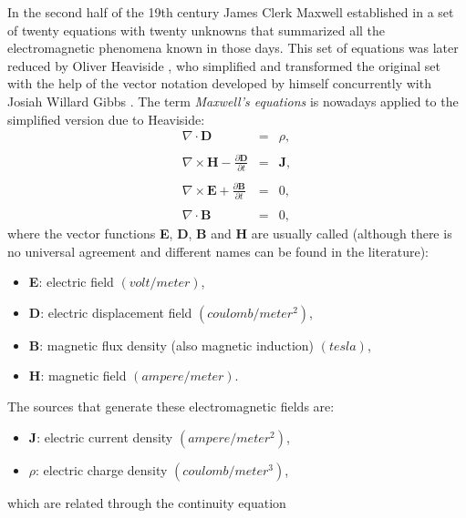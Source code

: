 In the second half of the 19th century James Clerk Maxwell established in \cite{OriginalMaxwell, TreatiseMaxwell} a set of twenty equations with twenty unknowns that summarized all the electromagnetic phenomena known in those days. This set of equations was later reduced by Oliver Heaviside \cite{HeavisideMaxwell, HeavisideBio}, who simplified and transformed the original set with the help of the vector notation developed by himself concurrently with Josiah Willard Gibbs \cite{GibbsVectors, GibbsBio}. The term \emph{Maxwell's equations} is nowadays applied to the simplified version due to Heaviside:
\\[-1.5em]
\begin{eqnarray}
    \nabla\cdot\mathbf{D} &=& \rho, \label{MaxwellDivD}
	\\\nonumber
	\\[-0.25em]
	\nabla\times\mathbf{H} - \frac{\partial\mathbf{D}}{\partial{t}}
	&=& \mathbf{J}, \label{MaxwellRotH}
	\\\nonumber
	\\[-0.25em]
	\nabla\times\mathbf{E} + \frac{\partial\mathbf{B}}{\partial{t}}
	&=& 0, \label{MaxwellRotE}
	\\\nonumber
	\\[-0.25em]
	\nabla \cdot \mathbf{B} &=& 0, \label{MaxwellDivB}
\end{eqnarray}
where the vector functions \textbf{E}, \textbf{D}, \textbf{B} and \textbf{H} are usually called (although there is no universal agreement and different names can be found in the literature):
\begin{itemize}
	\itemsep0em 
	\item[]\textbf{E}: electric field $\left(volt/meter\right)$,
	\item[]\textbf{D}: electric displacement field $\left(coulomb/meter^{2}\right)$,
	\item[]\textbf{B}: magnetic flux density (also magnetic induction) $\left(tesla\right)$,
	\item[]\textbf{H}: magnetic field $\left(ampere/meter\right)$.
\end{itemize}
The sources that generate these electromagnetic fields are:
\begin{itemize}
	\itemsep0em 
	\item[]\textbf{J}: electric current density $\left(ampere/meter^{2}\right)$,
	\item[]$\rho$: electric charge density $\left(coulomb/meter^{3}\right)$,
\end{itemize}
which are related through the continuity equation
